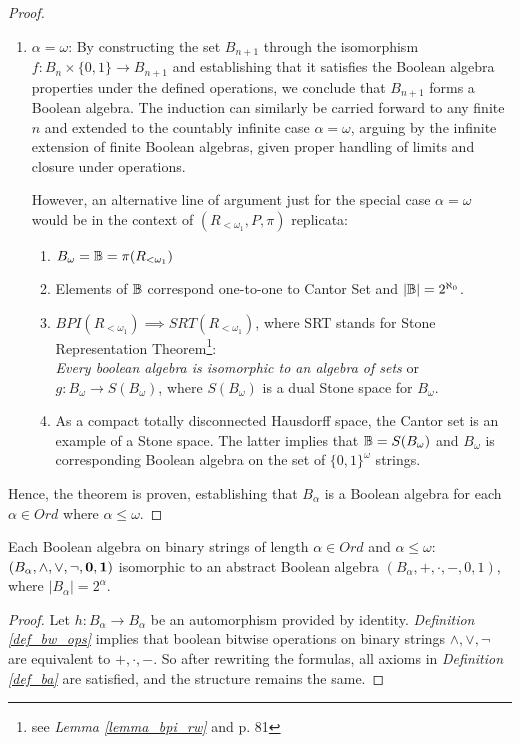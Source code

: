 \begin{proof}
\begin{enumerate}
\begin{enumerate}[label=(\roman*)]
      \end{enumerate}
    \item \textbf{$\alpha = \omega$}: By constructing the set \(B_{n+1}\) through the isomorphism \(f: B_n \times \{0,1\} \to B_{n+1}\) and establishing that it satisfies the Boolean algebra properties under the defined operations, we conclude that \(B_{n+1}\) forms a Boolean algebra. The induction can similarly be carried forward to any finite \(n\) and extended to the countably infinite case \(\alpha = \omega\), arguing by the infinite extension of finite Boolean algebras, given proper handling of limits and closure under operations.
    
    However, an alternative line of argument just for the special case $\alpha = \omega$ would be in the context of $(R_{<\omega_1}, P, \pi)$ replicata:
    \begin{enumerate}[label=(\roman*)]
      \item $B_\omega = \mathbb{B} = \pi(R_{<\omega_1})$
      \item Elements of $\mathbb{B}$ correspond one-to-one to Cantor Set and $|\mathbb{B}| = 2^{\aleph_0}$.
      \item $BPI(R_{<\omega_1}) \implies SRT(R_{<\omega_1})$, where SRT stands for Stone Representation Theorem\footnote{see \textit{Lemma \ref{lemma_bpi_rw}} and \cite{jech2003set} p. 81}:\\
        \textit{Every boolean algebra is isomorphic to an algebra of sets} or $g: B_\omega \to S(B_\omega)$, where $S(B_\omega)$ is a dual Stone space for $B_\omega$.
      \item As a compact totally disconnected Hausdorff space, the Cantor set is an example of a Stone space. The latter implies that $\mathbb{B} = S(B_\omega)$ and $B_\omega$ is corresponding Boolean algebra on the set of $\{0,1\}^\omega$ strings.
    \end{enumerate}
  \end{enumerate}
  
  Hence, the theorem is proven, establishing that \(B_\alpha\) is a Boolean algebra for each \(\alpha \in Ord\) where \(\alpha \leq \omega\).
\end{proof}



\begin{corollary}
  Each Boolean algebra on binary strings of length  $\alpha \in Ord$ and $\alpha \leq \omega$:  $(B_\alpha, \land, \lor, \neg, \bf{0}, \bf{1})$ isomorphic to an abstract Boolean algebra $(B_\alpha, +, \cdot, -, 0, 1)$, where $|B_\alpha| = 2^\alpha$.
\end{corollary}
\begin{proof}
  Let $h: B_\alpha \to B_\alpha$ be an automorphism provided by identity. \textit{Definition \ref{def_bw_ops}} implies that boolean bitwise operations on binary strings $\land, \lor, \neg$ are equivalent to $+,\cdot, -$. So after rewriting the formulas, all axioms in \textit{Definition \ref{def_ba}} are satisfied, and the structure remains the same.
\end{proof}

